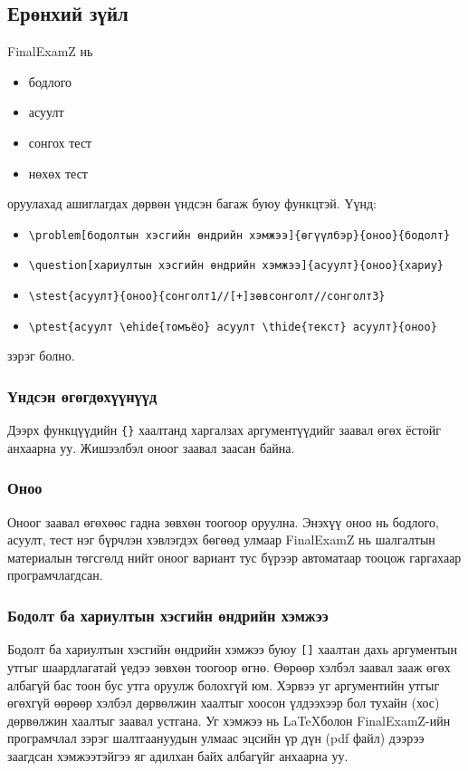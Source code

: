 \documentclass[10pt]{article}
\theoremstyle{definition}
\begin{document}
\subsection{Ерөнхий зүйл}

FinalExamZ нь
\begin{itemize}
 \item бодлого
 \item асуулт
 \item сонгох тест
 \item нөхөх тест
\end{itemize}
оруулахад ашиглагдах дөрвөн үндсэн багаж буюу функцтэй. Үүнд:
\begin{itemize}
 \item \verb|\problem[бодолтын хэсгийн өндрийн хэмжээ]{өгүүлбэр}{оноо}{бодолт}|
 \item \verb|\question[хариултын хэсгийн өндрийн хэмжээ]{асуулт}{оноо}{хариу}|
 \item \verb|\stest{асуулт}{оноо}{сонголт1//[+]зөвсонголт//сонголт3}|
 \item \verb|\ptest{асуулт \ehide{томъёо} асуулт \thide{текст} асуулт}{оноо}|
\end{itemize}
зэрэг болно. 

\subsubsection{Үндсэн өгөгдөхүүнүүд} Дээрх функцүүдийн \texttt{\{\}} хаалтанд харгалзах аргументүүдийг заавал өгөх ёстойг анхаарна уу. Жишээлбэл оноог заавал заасан байна. 

\subsubsection{Оноо} Оноог заавал өгөхөөс гадна зөвхөн тоогоор оруулна. Энэхүү оноо нь бодлого, асуулт, тест нэг бүрчлэн хэвлэгдэх бөгөөд улмаар FinalExamZ нь шалгалтын материалын төгсгөлд нийт оноог вариант тус бүрээр автоматаар тооцож гаргахаар програмчлагдсан.

\subsubsection{Бодолт ба хариултын хэсгийн өндрийн хэмжээ} Бодолт ба хариултын хэсгийн өндрийн хэмжээ буюу \texttt{[]} хаалтан дахь аргументын утгыг шаардлагатай үедээ зөвхөн тоогоор өгнө. Өөрөөр хэлбэл заавал зааж өгөх албагүй бас тоон бус утга оруулж болохгүй юм. Хэрвээ уг аргументийн утгыг өгөхгүй өөрөөр хэлбэл дөрвөлжин хаалтыг хоосон үлдээхээр бол тухайн (хос) дөрвөлжин хаалтыг заавал устгана. Уг хэмжээ нь \LaTeX болон FinalExamZ-ийн програмчлал зэрэг шалтгаануудын улмаас эцсийн үр дүн (pdf файл) дээрээ заагдсан хэмжээтэйгээ яг адилхан байх албагүйг анхаарна уу.
\end{document}

